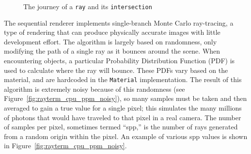 \vspace{0.3em}
\begin{figure}[htb]
  \centering
  \caption{The journey of a \texttt{ray} and its \texttt{intersection}}
  \label{fig:rayterm-cpu_raytrace_journey_of_a_ray}
\end{figure}

 \label{ch:methods:renderer:sequential:algorithms}

The sequential renderer implements single-branch Monte Carlo ray-tracing, a type of rendering that can produce physically accurate images with little development effort.
The algorithm is largely based on randomness, only modifying the path of a single ray as it bounces around the scene.
When encountering objects, a particular Probability Distribution Function (PDF) is used to calculate where the ray will bounce.
These PDFs vary based on the material, and are hardcoded in the \texttt{Material} implementation.
The result of this algorithm is extremely noisy because of this randomness (see Figure~\ref{fig:rayterm_cpu_ppm_noisy}), so many samples must be taken and then averaged to gain a true value for a single pixel; this simulates the many millions of photons that would have traveled to that pixel in a real camera.
The number of samples per pixel, sometimes termed ``spp,'' is the number of rays generated from a random origin within the pixel.
An example of various spp values is shown in Figure~\ref{fig:rayterm_cpu_ppm_noisy}.

